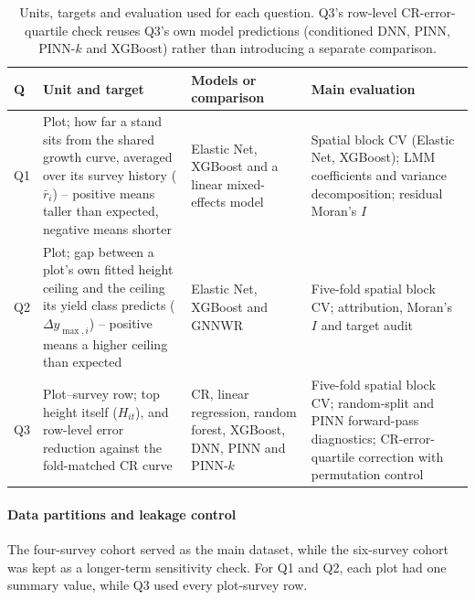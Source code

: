 \begin{table}[!ht]
\centering
\footnotesize
\renewcommand{\arraystretch}{1.2}
\begin{tabularx}{\linewidth}{@{} l >{\raggedright\arraybackslash}X >{\raggedright\arraybackslash}X >{\raggedright\arraybackslash}X @{}}
\toprule
Q & Unit and target & Models or comparison & Main evaluation \\
\midrule
Q1 & Plot; how far a stand sits from the shared growth curve, averaged over its survey history ($\bar r_i$) -- positive means taller than expected, negative means shorter & Elastic Net, XGBoost and a linear
mixed-effects model & Spatial block CV (Elastic Net, XGBoost); LMM coefficients and variance decomposition; residual Moran's $I$ \\
Q2 & Plot; gap between a plot's own fitted height ceiling and the ceiling its yield class predicts ($\Delta y_{\max,i}$) -- positive means a higher ceiling than expected & Elastic Net, XGBoost
and GNNWR & Five-fold spatial block CV; attribution, Moran's $I$ and target audit \\
Q3 & Plot--survey row; top height itself ($H_{it}$), and row-level error reduction against the
fold-matched CR curve & CR, linear regression, random forest, XGBoost, DNN, PINN and PINN-$k$
& Five-fold spatial block CV; random-split and PINN forward-pass diagnostics; CR-error-quartile
correction with permutation control \\
\bottomrule
\end{tabularx}
\caption{\small{Units, targets and evaluation used for each question. Q3's row-level CR-error-quartile
check reuses Q3's own model predictions (conditioned DNN, PINN, PINN-$k$ and XGBoost) rather
than introducing a separate comparison.}}
\label{tab:rq-framework}
\end{table}

\paragraph*{Data partitions and leakage control}
The four-survey cohort served as the main dataset, while the six-survey cohort was kept as a longer-term sensitivity check. For Q1 and Q2, each plot had one summary value, while Q3 used every plot-survey row.

